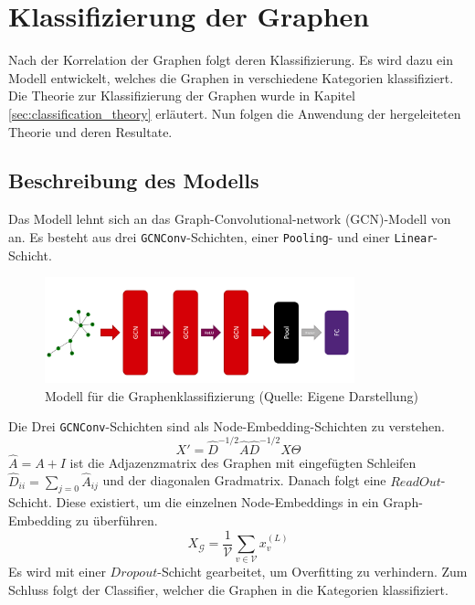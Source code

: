 \section{Klassifizierung der Graphen} \label{sec:classification}

Nach der Korrelation der Graphen folgt deren Klassifizierung.
Es wird dazu ein Modell entwickelt, welches die Graphen in verschiedene Kategorien klassifiziert.
Die Theorie zur Klassifizierung der Graphen wurde in Kapitel \ref{sec:classification_theory} erläutert. Nun folgen die Anwendung der hergeleiteten Theorie und deren Resultate.

\subsection{Beschreibung des Modells}

Das Modell lehnt sich an das Graph-Convolutional-network (GCN)-Modell von \cite{kipf_semi-supervised_2017} an.
Es besteht aus drei \texttt{GCNConv}-Schichten, einer \texttt{Pooling}- und einer \texttt{Linear}-Schicht.

\begin{figure}[H]
    \centering
    \includegraphics[width=0.8\textwidth]{images/30_results/nn_architecture.png}
    \caption{Modell für die Graphenklassifizierung (Quelle: Eigene Darstellung)}
    \label{fig:model}
\end{figure}

Die Drei \texttt{GCNConv}-Schichten sind als Node-Embedding-Schichten zu verstehen.
\begin{equation}
    X' = \hat{D}^{-1/2} \hat{A} \hat{D}^{-1/2} X \Theta
\end{equation}
$\hat{A} = A + I$ ist die Adjazenzmatrix des Graphen mit eingefügten Schleifen $ \hat{D}_{ii} = \sum_{j=0}{\hat{A}_{ij}} $ und der diagonalen Gradmatrix.
Danach folgt eine $ReadOut$-Schicht. Diese existiert, um die einzelnen Node-Embeddings in ein Graph-Embedding zu überführen.
\begin{equation}
    X_{\mathcal{G}} = \frac{1}{\mathcal{V}} \sum_{v \in {\mathcal{V}}}{x_v^{(L)}}
\end{equation}
Es wird mit einer $Dropout$-Schicht \cite{srivastava_dropout_2014} gearbeitet, um Overfitting zu verhindern.
Zum Schluss folgt der Classifier, welcher die Graphen in die Kategorien klassifiziert.

